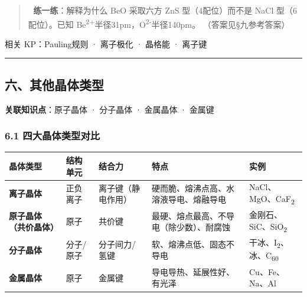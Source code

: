 \begin{quote}
📝 \textbf{练一练}：解释为什么 BeO 采取六方 ZnS 型（4配位）而不是 NaCl 型（6配位）。已知 Be\textsuperscript{2+}半径31pm，O\textsuperscript{2-}半径140pm。
（答案见§九参考答案）
\end{quote}

相关 KP：Pauling规则 · 离子极化 · 晶格能 · 离子键

\begin{center}\rule{0.5\linewidth}{0.5pt}\end{center}

\subsection{六、其他晶体类型}\label{ux516dux5176ux4ed6ux6676ux4f53ux7c7bux578b}

\textbf{关联知识点}：原子晶体 · 分子晶体 · 金属晶体 · 金属键

\subsubsection{6.1 四大晶体类型对比}\label{ux56dbux5927ux6676ux4f53ux7c7bux578bux5bf9ux6bd4}

{\def\LTcaptype{none} %
\begin{longtable}[]{@{}
  >{\raggedright\arraybackslash}p{}
  >{\raggedright\arraybackslash}p{}
  >{\raggedright\arraybackslash}p{}
  >{\raggedright\arraybackslash}p{}
  >{\raggedright\arraybackslash}p{}@{}}
\toprule\noalign{}
\begin{minipage}[b]{\linewidth}\raggedright
晶体类型
\end{minipage} & \begin{minipage}[b]{\linewidth}\raggedright
结构单元
\end{minipage} & \begin{minipage}[b]{\linewidth}\raggedright
结合力
\end{minipage} & \begin{minipage}[b]{\linewidth}\raggedright
特点
\end{minipage} & \begin{minipage}[b]{\linewidth}\raggedright
实例
\end{minipage} \\
\midrule\noalign{}
\endhead
\bottomrule\noalign{}
\endlastfoot
\textbf{离子晶体} & 正负离子 & 离子键（静电作用） & 硬而脆、熔沸点高、水溶液导电、熔融导电 & NaCl、MgO、CaF\textsubscript{2} \\
\textbf{原子晶体（共价晶体）} & 原子 & 共价键 & 最硬、熔点最高、不导电（除少数）、耐腐蚀 & 金刚石、SiC、SiO\textsubscript{2} \\
\textbf{分子晶体} & 分子/原子 & 分子间力/氢键 & 软、熔沸点低、固态不导电 & 干冰、I\textsubscript{2}、冰、C\textsubscript{60} \\
\textbf{金属晶体} & 原子 & 金属键 & 导电导热、延展性好、有光泽 & Cu、Fe、Na、Al \\
\end{longtable}
}

